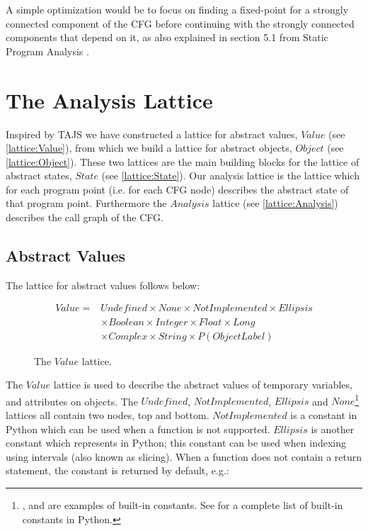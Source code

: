 A simple optimization would be to focus on finding a fixed-point for a strongly connected component of the CFG before continuing with the strongly connected components that depend on it, as also explained in section 5.1 from Static Program Analysis \cite{sa}.

\section{The Analysis Lattice}
Inspired by TAJS \cite{tajs} we have constructed a lattice for abstract values, $Value$ (see \autoref{lattice:Value}), from which we build a lattice for abstract objects, $Object$ (see \autoref{lattice:Object}). These two lattices are the main building blocks for the lattice of abstract states, $State$ (see \autoref{lattice:State}). Our analysis lattice is the lattice which for each program point (i.e. for each CFG node) describes the abstract state of that program point. Furthermore the $Analysis$ lattice (see \autoref{lattice:Analysis}) describes the call graph of the CFG.

\subsection{Abstract Values}
The lattice for abstract values follows below:

\begin{figure}[H]
\begin{eqnarray*}
Value = & Undefined \times None \times NotImplemented \times Ellipsis \\
        & \times Boolean \times Integer \times Float \times Long \\
        & \times Complex \times String \times P(ObjectLabel)
\end{eqnarray*}
\vspace{-15pt}
\caption{The $Value$ lattice.}
\label{lattice:Value}
\end{figure}

The $Value$ lattice is used to describe the abstract values of temporary variables, and attributes on objects. The $Undefined$, $NotImplemented$, $Ellipsis$ and $None$\footnote{,  and  are examples of built-in constants. See \cite{pyref.constants} for a complete list of built-in constants in Python.} lattices all contain two nodes, top and bottom. $NotImplemented$ is a constant in Python which can be used when a function is not supported. $Ellipsis$ is another constant which represents \inlinecode{\dots} in Python; this constant can be used when indexing using intervals (also known as slicing). When a function does not contain a return statement, the constant  is returned by default, e.g.:

